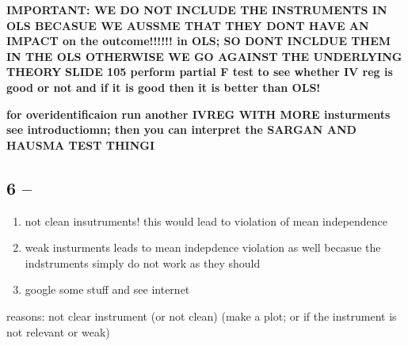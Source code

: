\documentclass[a4paper]{article}
\begin{document}
\textbf{IMPORTANT: WE DO NOT INCLUDE THE INSTRUMENTS IN OLS BECASUE WE AUSSME THAT THEY DONT HAVE AN IMPACT on the outcome!!!!!! in OLS; SO DONT INCLDUE THEM IN THE OLS OTHERWISE WE GO AGAINST THE UNDERLYING THEORY}
\textbf{SLIDE 105 perform partial F test to see whether IV reg is good or not and if it is good then it is better than OLS!}

\textbf{for overidentificaion run another IVREG WITH MORE insturments see introductiomn; then you can interpret the SARGAN AND HAUSMA TEST THINGI}

\subsection{6 -- }

\begin{enumerate}
   \item not clean insutruments! this would lead to violation of mean independence
   \item weak insturments leads to mean indepdence violation as well becasue the indstruments simply do not work as they should 
   \item google some stuff and see internet
\end{enumerate}



reasons: not clear instrument (or not clean) (make a plot; or if the instrument is not relevant or weak)


\end{document}
